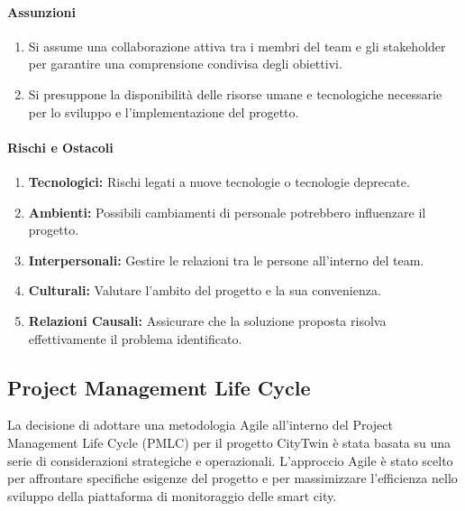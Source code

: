 \paragraph{Assunzioni}

\begin{enumerate}
    \item Si assume una collaborazione attiva tra i membri del team e gli stakeholder per garantire una comprensione condivisa degli obiettivi.

    \item Si presuppone la disponibilità delle risorse umane e tecnologiche necessarie per lo sviluppo e l'implementazione del progetto.
\end{enumerate}

\paragraph{Rischi e Ostacoli}

\begin{enumerate}
    \item \textbf{Tecnologici:} Rischi legati a nuove tecnologie o tecnologie deprecate.

    \item \textbf{Ambienti:} Possibili cambiamenti di personale potrebbero influenzare il progetto.

    \item \textbf{Interpersonali:} Gestire le relazioni tra le persone all'interno del team.

    \item \textbf{Culturali:} Valutare l'ambito del progetto e la sua convenienza.

    \item \textbf{Relazioni Causali:} Assicurare che la soluzione proposta risolva effettivamente il problema identificato.
\end{enumerate}

\subsection{Project Management Life Cycle}

La decisione di adottare una metodologia Agile all'interno del Project Management Life Cycle (PMLC) per il progetto CityTwin è stata basata su una serie di considerazioni strategiche e operazionali. L'approccio Agile è stato scelto per affrontare specifiche esigenze del progetto e per massimizzare l'efficienza nello sviluppo della piattaforma di monitoraggio delle smart city.

